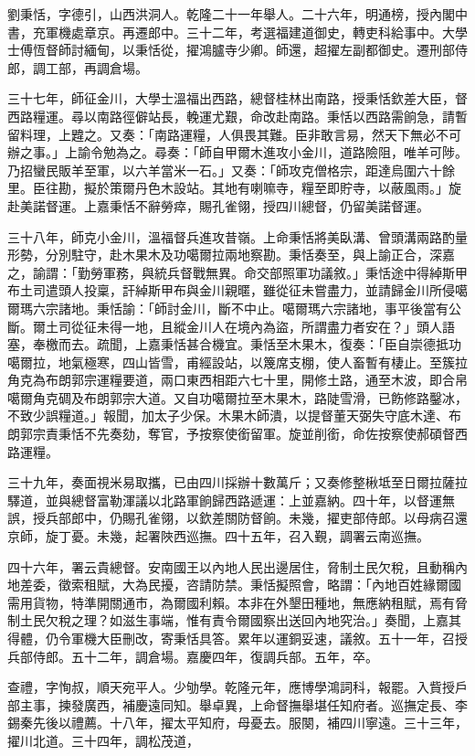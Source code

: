 \begin{pinyinscope}
劉秉恬，字德引，山西洪洞人。乾隆二十一年舉人。二十六年，明通榜，授內閣中書，充軍機處章京。再遷郎中。三十二年，考選福建道御史，轉吏科給事中。大學士傅恆督師討緬甸，以秉恬從，擢鴻臚寺少卿。師還，超擢左副都御史。遷刑部侍郎，調工部，再調倉場。

三十七年，師征金川，大學士溫福出西路，總督桂林出南路，授秉恬欽差大臣，督西路糧運。尋以南路徑僻站長，輓運尤艱，命改赴南路。秉恬以西路需餉急，請暫留料理，上韙之。又奏：「南路運糧，人俱畏其難。臣非敢言易，然天下無必不可辦之事。」上諭令勉為之。尋奏：「師自甲爾木進攻小金川，道路險阻，唯羊可陟。乃招蠻民販羊至軍，以六羊當米一石。」又奏：「師攻克僧格宗，距達烏圍六十餘里。臣往勘，擬於策爾丹色木設站。其地有喇嘛寺，糧至即貯寺，以蔽風雨。」旋赴美諾督運。上嘉秉恬不辭勞瘁，賜孔雀翎，授四川總督，仍留美諾督運。

三十八年，師克小金川，溫福督兵進攻昔嶺。上命秉恬將美臥溝、曾頭溝兩路酌量形勢，分別駐守，赴木果木及功噶爾拉兩地察勘。秉恬奏至，與上諭正合，深嘉之，諭謂：「勤勞軍務，與統兵督戰無異。命交部照軍功議敘。」秉恬途中得綽斯甲布土司遣頭人投稟，訐綽斯甲布與金川親暱，雖從征未嘗盡力，並請歸金川所侵噶爾瑪六宗諸地。秉恬諭：「師討金川，斷不中止。噶爾瑪六宗諸地，事平後當有公斷。爾土司從征未得一地，且縱金川人在境內為盜，所謂盡力者安在？」頭人語塞，奉檄而去。疏聞，上嘉秉恬甚合機宜。秉恬至木果木，復奏：「臣自崇德抵功噶爾拉，地氣極寒，四山皆雪，甫經設站，以篾席支棚，使人畜暫有棲止。至簇拉角克為布朗郭宗運糧要道，兩口東西相距六七十里，開修土路，通至木波，即合帛噶爾角克碉及布朗郭宗大道。又自功噶爾拉至木果木，路陡雪滑，已飭修路鑿冰，不致少誤糧道。」報聞，加太子少保。木果木師潰，以提督董天弼失守底木達、布朗郭宗責秉恬不先奏劾，奪官，予按察使銜留軍。旋並削銜，命佐按察使郝碩督西路運糧。

三十九年，奏面視米易取攜，已由四川採辦十數萬斤；又奏修整楸坻至日爾拉薩拉驛道，並與總督富勒渾議以北路軍餉歸西路遞運：上並嘉納。四十年，以督運無誤，授兵部郎中，仍賜孔雀翎，以欽差關防督餉。未幾，擢吏部侍郎。以母病召還京師，旋丁憂。未幾，起署陜西巡撫。四十五年，召入覲，調署云南巡撫。

四十六年，署云貴總督。安南國王以內地人民出邊居住，脅制土民欠稅，且動稱內地差委，徵索租賦，大為民擾，咨請防禁。秉恬擬照會，略謂：「內地百姓緣爾國需用貨物，特準開關通市，為爾國利賴。本非在外墾田種地，無應納租賦，焉有脅制土民欠稅之理？如滋生事端，惟有責令爾國察出送回內地究治。」奏聞，上嘉其得體，仍令軍機大臣刪改，寄秉恬具答。累年以運銅妥速，議敘。五十一年，召授兵部侍郎。五十二年，調倉場。嘉慶四年，復調兵部。五年，卒。

查禮，字恂叔，順天宛平人。少劬學。乾隆元年，應博學鴻詞科，報罷。入貲授戶部主事，揀發廣西，補慶遠同知。舉卓異，上命督撫舉堪任知府者。巡撫定長、李錫秦先後以禮薦。十八年，擢太平知府，母憂去。服闋，補四川寧遠。三十三年，擢川北道。三十四年，調松茂道，


\end{pinyinscope}
